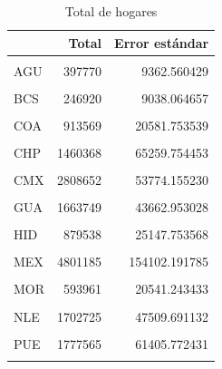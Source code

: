 \documentclass[
]{article}
\begin{document}
\begin{table}[H]

\caption{\label{tab:unnamed-chunk-13}Total de hogares}
\centering
\begin{tabular}[t]{lrr}
\toprule
  & Total & Error estándar\\
\midrule
\cellcolor{gray!6}{Nivel nacional} & \cellcolor{gray!6}{36210467} & \cellcolor{gray!6}{250260.723090}\\
AGU & 397770 & 9362.560429\\
\cellcolor{gray!6}{BCN} & \cellcolor{gray!6}{1156528} & \cellcolor{gray!6}{30667.900587}\\
BCS & 246920 & 9038.064657\\
\cellcolor{gray!6}{CAM} & \cellcolor{gray!6}{262489} & \cellcolor{gray!6}{10080.177465}\\
\addlinespace
COA & 913569 & 20581.753539\\
\cellcolor{gray!6}{COL} & \cellcolor{gray!6}{234272} & \cellcolor{gray!6}{8612.212124}\\
CHP & 1460368 & 65259.754453\\
\cellcolor{gray!6}{CHH} & \cellcolor{gray!6}{1147667} & \cellcolor{gray!6}{21729.674891}\\
CMX & 2808652 & 53774.155230\\
\addlinespace
\cellcolor{gray!6}{DUR} & \cellcolor{gray!6}{507158} & \cellcolor{gray!6}{12451.339215}\\
GUA & 1663749 & 43662.953028\\
\cellcolor{gray!6}{GRO} & \cellcolor{gray!6}{969487} & \cellcolor{gray!6}{29227.595625}\\
HID & 879538 & 25147.753568\\
\cellcolor{gray!6}{JAL} & \cellcolor{gray!6}{2384946} & \cellcolor{gray!6}{60219.557229}\\
\addlinespace
MEX & 4801185 & 154102.191785\\
\cellcolor{gray!6}{MIC} & \cellcolor{gray!6}{1340554} & \cellcolor{gray!6}{48980.807753}\\
MOR & 593961 & 20541.243433\\
\cellcolor{gray!6}{NAY} & \cellcolor{gray!6}{364784} & \cellcolor{gray!6}{10262.248527}\\
NLE & 1702725 & 47509.691132\\
\addlinespace
\cellcolor{gray!6}{OAX} & \cellcolor{gray!6}{1157915} & \cellcolor{gray!6}{53248.154463}\\
PUE & 1777565 & 61405.772431\\
\cellcolor{gray!6}{QUE} & \cellcolor{gray!6}{680255} & \cellcolor{gray!6}{33271.499208}\\

\end{tabular}
\end{table}
\end{document}
